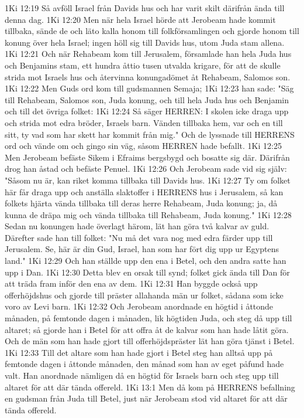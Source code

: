 1Ki 12:19  Så avföll Israel från Davids hus och har varit skilt därifrån ända till denna dag.
1Ki 12:20  Men när hela Israel hörde att Jerobeam hade kommit tillbaka, sände de och läto kalla honom till folkförsamlingen och gjorde honom till konung över hela Israel; ingen höll sig till Davids hus, utom Juda stam allena.
1Ki 12:21  Och när Rehabeam kom till Jerusalem, församlade han hela Juda hus och Benjamins stam, ett hundra åttio tusen utvalda krigare, för att de skulle strida mot Israels hus och återvinna konungadömet åt Rehabeam, Salomos son.
1Ki 12:22  Men Guds ord kom till gudsmannen Semaja;
1Ki 12:23  han sade: "Säg till Rehabeam, Salomos son, Juda konung, och till hela Juda hus och Benjamin och till det övriga folket:
1Ki 12:24  Så säger HERREN: I skolen icke draga upp och strida mot edra bröder, Israels barn. Vänden tillbaka hem, var och en till sitt, ty vad som har skett har kommit från mig." Och de lyssnade till HERRENS ord och vände om och gingo sin väg, såsom HERREN hade befallt.
1Ki 12:25  Men Jerobeam befäste Sikem i Efraims bergsbygd och bosatte sig där. Därifrån drog han åstad och befäste Penuel.
1Ki 12:26  Och Jerobeam sade vid sig själv: "Såsom nu är, kan riket komma tillbaka till Davids hus.
1Ki 12:27  Ty om folket här får draga upp och anställa slaktoffer i HERRENS hus i Jerusalem, så kan folkets hjärta vända tillbaka till deras herre Rehabeam, Juda konung; ja, då kunna de dräpa mig och vända tillbaka till Rehabeam, Juda konung."
1Ki 12:28  Sedan nu konungen hade överlagt härom, lät han göra två kalvar av guld. Därefter sade han till folket: "Nu må det vara nog med edra färder upp till Jerusalem. Se, här är din Gud, Israel, han som har fört dig upp ur Egyptens land."
1Ki 12:29  Och han ställde upp den ena i Betel, och den andra satte han upp i Dan.
1Ki 12:30  Detta blev en orsak till synd; folket gick ända till Dan för att träda fram inför den ena av dem.
1Ki 12:31  Han byggde också upp offerhöjdshus och gjorde till präster allahanda män ur folket, sådana som icke voro av Levi barn.
1Ki 12:32  Och Jerobeam anordnade en högtid i åttonde månaden, på femtonde dagen i månaden, lik högtiden Juda, och steg då upp till altaret; så gjorde han i Betel för att offra åt de kalvar som han hade låtit göra. Och de män som han hade gjort till offerhöjdspräster lät han göra tjänst i Betel.
1Ki 12:33  Till det altare som han hade gjort i Betel steg han alltså upp på femtonde dagen i åttonde månaden, den månad som han av eget påfund hade valt. Han anordnade nämligen då en högtid för Israels barn och steg upp till altaret för att där tända offereld.
1Ki 13:1  Men då kom på HERRENS befallning en gudsman från Juda till Betel, just när Jerobeam stod vid altaret för att där tända offereld.
